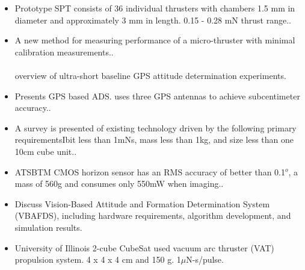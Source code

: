 \begin{itemize}
\item Prototype SPT consists of 36 individual thrusters with chambers 1.5 mm in diameter and approximately 3 mm in length. 0.15 - 0.28 mN thrust range.\cite{Ref:Sathiyanathan10}. 
\item A new method for measuring performance of a micro-thruster with minimal calibration measurements.\cite{Ref:Chang08}. \\\\
overview of ultra-short baseline GPS attitude determination experiments\cite{Ref:Bageshwar06}. 
\item Presents GPS based ADS. uses three GPS antennas to achieve subcentimeter accuracy.\cite{Ref:Gershman06}. 

\item A survey is presented of existing technology driven by the following primary requirementsIbit less than 1mNs, mass less than 1kg, and size less than one 10cm cube unit.\cite{Ref:Storck06}. 

\item ATSBTM CMOS horizon sensor has an RMS accuracy of better than 0.1$^o$, a mass of 560g and consumes only 550mW when imaging.\cite{Ref:Bahar06}. 

\item Discuss Vision-Based Attitude and Formation Determination System (VBAFDS), including hardware requirements, algorithm development, and simulation results\cite{Ref:Rogers04}. 

\item University of Illinois 2-cube CubeSat used vacuum arc thruster (VAT) propulsion system.  4 x 4 x 4 cm and 150 g.  1$\mu$N-s/pulse\cite{Ref:Rysanek02}. 
\end{itemize}




%
%

%
